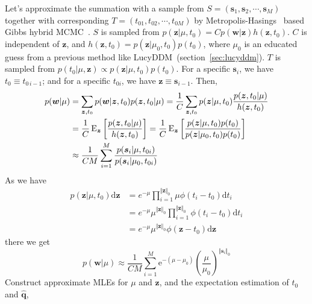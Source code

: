 Let's approximate the summation with a sample from $S = (\bm{s}_1, \bm{s}_2, \cdots, \bm{s}_M)$ together with corresponding $T = (t_{01}, t_{02}, \cdots, t_{0M})$ by Metropolis-Hasings~\cite{metropolis_equation_1953, hastings_monte_1970, mackay_information_2003} based Gibbs hybrid MCMC~\cite{tierney_1994}. $S$ is sampled from $p(\bm{z}|\mu, t_0) = C p(\bm{w} | \bm{z}) h(\bm{z}, t_0)$. $C$ is independent of $\bm{z}$, and $h(\bm{z}, t_0) = p(\bm{z}|\mu_0, t_0)p(t_0)$, where $\mu_0$ is an educated guess from a previous method like LucyDDM~(section~\ref{sec:lucyddm}). $T$ is sampled from $p(t_0|\mu, \bm{z}) \propto p(\bm{z}|\mu, t_0)p(t_0)$. For a specific $\bm{s}_i$, we have $t_0\equiv t_{0\,i-1}$; and for a specific $t_{0i}$, we have $\bm{z}\equiv \bm{s}_{i-1}$. Then,
\begin{equation}
  \label{eq:mh}
  \begin{aligned}
    p(\bm{w}|\mu) &= \sum_{\bm{z}, t_0} p(\bm{w}|\bm{z}, t_0) p(\bm{z}, t_0|\mu) = \frac{1}{C}\sum_{\bm{z}, t_0} p(\bm{z}|\mu, t_0) \frac{p(\bm{z}, t_0 | \mu)}{h(\bm{z}, t_0)} \\
    &= \frac{1}{C} \operatorname{E}_{\bm{z}}\left[ \frac{p(\bm{z}, t_0 | \mu)}{h(\bm{z}, t_0)} \right] = \frac{1}{C} \operatorname{E}_{\bm{z}}\left[ \frac{p(\bm{z} | \mu, t_0)p(t_0)}{p(\bm{z} | \mu_0, t_0)p(t_0)} \right]\\
    &\approx \frac{1}{CM} \sum_{i=1}^M \frac{p(\bm{s}_i | \mu, t_{0i})}{p(\bm{s}_i | \mu_0, t_{0i})}
  \end{aligned}
\end{equation}
As we have
\begin{equation}
  \label{eq:light_curve_sample_p}
  \begin{aligned}
    p( \bm{z} | \mu, t_0) \mathrm{d}\bm{z} & = e^{-\mu}\prod_{i=1}^{\Vert \bm{z} \Vert_0} \mu \phi(t_i - t_0) \mathrm{d}t_i \\
    & = e^{-\mu} \mu^{\Vert \bm{z} \Vert_0} \prod_{i=1}^{\Vert \bm{z} \Vert_0}  \phi(t_i - t_0) \mathrm{d}t_i \\
    & = e^{-\mu} \mu^{\Vert \bm{z} \Vert_0} \phi(\bm{z} - t_0) \mathrm{d}\bm{z}
  \end{aligned}
\end{equation}
there we get
\begin{equation}
  \label{eq:final_mh}
  p(\bm{w}|\mu) \approx \frac{1}{CM} \sum_{i=1}^M \mathrm{e}^{-(\mu-\mu_0)}{\left(\frac{\mu}{\mu_0}  \right)}^{\Vert \bm{s}_i \Vert_0}
\end{equation}
Construct approximate MLEs for $\mu$ and $\bm{z}$, and the expectation estimation of $t_0$ and $\hat{\bm{q}}$,
